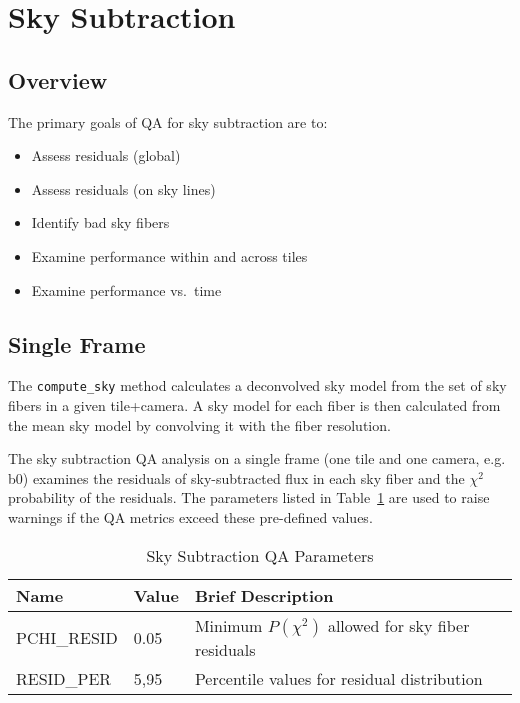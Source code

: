 \documentclass[12pt]{article}
\newenvironment{myitemize}
{ \begin{itemize}
    \setlength{\itemsep}{0pt}
    \setlength{\parskip}{0pt}
    \setlength{\parsep}{0pt}     }
{ \end{itemize}                  }
\begin{document}
\section{Sky Subtraction}

\subsection{Overview}

The primary goals of QA for sky subtraction are to:

\begin{myitemize}
\item Assess residuals (global)
\item Assess residuals (on sky lines)
\item Identify bad sky fibers
\item Examine performance within and across tiles
\item Examine performance vs.\ time
\end{myitemize}

\subsection{Single Frame}

The {\tt compute\_sky} method calculates a deconvolved sky model
from the set of sky fibers in a given tile+camera.  
A sky model for each fiber is then calculated from the 
mean sky model by convolving it with the fiber resolution.

The sky subtraction QA analysis on a single 
frame (one tile and one camera, e.g. b0)
examines the residuals of sky-subtracted flux in each sky fiber 
and the $\chi^2$ probability of the residuals.
The parameters listed in Table~\ref{tab:sky_param}
are used to raise warnings if the QA metrics exceed 
these pre-defined values.

\begin{table}[h]
\begin{center}
\caption{Sky Subtraction QA Parameters}
\label{tab:sky_param}
\begin{tabular}{p{3.5cm}p{1.2cm}p{8.3cm}}
\hline
{\bf Name} & {\bf Value} & {\bf Brief Description}\\
\hline
PCHI\_RESID    & 0.05 & Minimum $P(\chi^2)$ allowed for sky fiber residuals \\ 
RESID\_PER     & 5,95 & Percentile values for residual distribution \\
\hline
\end{tabular}
\end{center}
\end{table}
\end{document}
